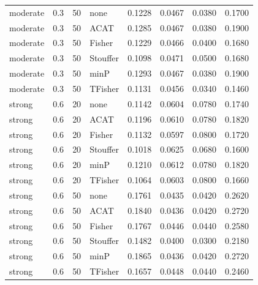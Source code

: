 \begin{table}[!htbp]
{\begin{tabular*}{\linewidth}{@{\extracolsep{\fill}}llrlrrrr}
moderate & 0.3 & 50 & none & 0.1228 & 0.0467 & 0.0380 & 0.1700 \\
moderate & 0.3 & 50 & ACAT & 0.1285 & 0.0467 & 0.0380 & 0.1900 \\
moderate & 0.3 & 50 & Fisher & 0.1229 & 0.0466 & 0.0400 & 0.1680 \\
moderate & 0.3 & 50 & Stouffer & 0.1098 & 0.0471 & 0.0500 & 0.1680 \\
moderate & 0.3 & 50 & minP & 0.1293 & 0.0467 & 0.0380 & 0.1900 \\
moderate & 0.3 & 50 & TFisher & 0.1131 & 0.0456 & 0.0340 & 0.1460 \\
strong & 0.6 & 20 & none & 0.1142 & 0.0604 & 0.0780 & 0.1740 \\
strong & 0.6 & 20 & ACAT & 0.1196 & 0.0610 & 0.0780 & 0.1820 \\
strong & 0.6 & 20 & Fisher & 0.1132 & 0.0597 & 0.0800 & 0.1720 \\
strong & 0.6 & 20 & Stouffer & 0.1018 & 0.0625 & 0.0680 & 0.1600 \\
strong & 0.6 & 20 & minP & 0.1210 & 0.0612 & 0.0780 & 0.1820 \\
strong & 0.6 & 20 & TFisher & 0.1064 & 0.0603 & 0.0800 & 0.1660 \\
strong & 0.6 & 50 & none & 0.1761 & 0.0435 & 0.0420 & 0.2620 \\
strong & 0.6 & 50 & ACAT & 0.1840 & 0.0436 & 0.0420 & 0.2720 \\
strong & 0.6 & 50 & Fisher & 0.1767 & 0.0446 & 0.0440 & 0.2580 \\
strong & 0.6 & 50 & Stouffer & 0.1482 & 0.0400 & 0.0300 & 0.2180 \\
strong & 0.6 & 50 & minP & 0.1865 & 0.0436 & 0.0420 & 0.2720 \\
strong & 0.6 & 50 & TFisher & 0.1657 & 0.0448 & 0.0440 & 0.2460 \\
\hline
\end{tabular*}}
\end{table}
